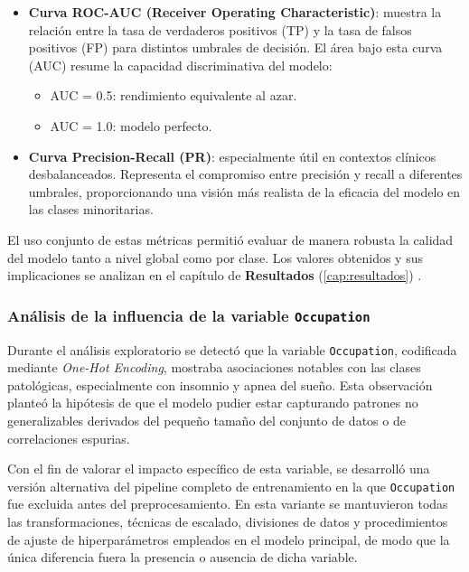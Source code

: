 \begin{itemize}
    \item \textbf{Curva ROC-AUC (Receiver Operating Characteristic)}: muestra la relación entre la tasa de verdaderos positivos (TP) y la tasa de falsos positivos (FP) para distintos umbrales de decisión. El área bajo esta curva (AUC) resume la capacidad discriminativa del modelo:
    \begin{itemize}
        \item AUC = 0.5: rendimiento equivalente al azar.
        \item AUC = 1.0: modelo perfecto.
    \end{itemize}

    \item \textbf{Curva Precision-Recall (PR)}: especialmente útil en contextos clínicos desbalanceados. Representa el compromiso entre precisión y recall a diferentes umbrales, proporcionando una visión más realista de la eficacia del modelo en las clases minoritarias.
\end{itemize}

El uso conjunto de estas métricas permitió evaluar de manera robusta la calidad del modelo tanto a nivel global como por clase. Los valores obtenidos y sus implicaciones se analizan en el capítulo de \textbf{Resultados} (\ref{cap:resultados}) \cite{powers2020evaluation}.


\subsubsection{Análisis de la influencia de la variable \texttt{Occupation}}

Durante el análisis exploratorio se detectó que la variable \texttt{Occupation}, codificada mediante \textit{One-Hot Encoding}, mostraba asociaciones notables con las clases patológicas, especialmente con insomnio y apnea del sueño. Esta observación planteó la hipótesis de que el modelo pudier estar capturando patrones no generalizables derivados del pequeño tamaño del conjunto de datos o de correlaciones espurias.

Con el fin de valorar el impacto específico de esta variable, se desarrolló una versión alternativa del pipeline completo de entrenamiento en la que \texttt{Occupation} fue excluida antes del preprocesamiento. En esta variante se mantuvieron todas las transformaciones, técnicas de escalado, divisiones de datos y procedimientos de ajuste de hiperparámetros empleados en el modelo principal, de modo que la única diferencia fuera la presencia o ausencia de dicha variable.

